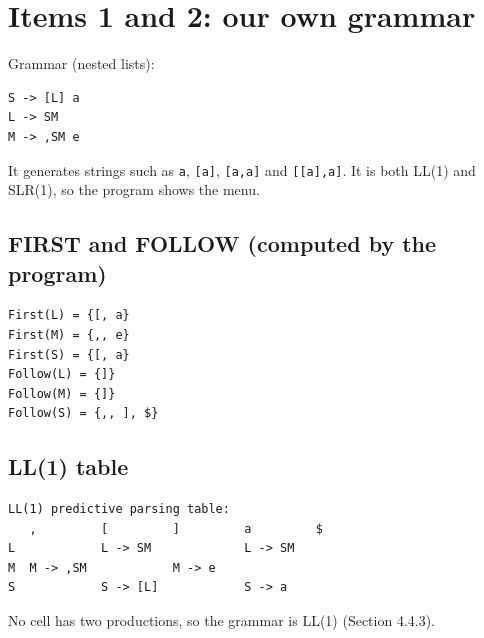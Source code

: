 \documentclass[11pt]{article}
\begin{document}
\section{Items 1 and 2: our own grammar}
Grammar (nested lists):
\begin{verbatim}
S -> [L] a
L -> SM
M -> ,SM e
\end{verbatim}
It generates strings such as \texttt{a}, \texttt{[a]}, \texttt{[a,a]} and \texttt{[[a],a]}.
It is both LL(1) and SLR(1), so the program shows the menu.

\subsection{FIRST and FOLLOW (computed by the program)}
\begin{verbatim}
First(L) = {[, a}
First(M) = {,, e}
First(S) = {[, a}
Follow(L) = {]}
Follow(M) = {]}
Follow(S) = {,, ], $}
\end{verbatim}

\subsection{LL(1) table}
\begin{verbatim}
LL(1) predictive parsing table:
   ,         [         ]         a         $         
L            L -> SM             L -> SM             
M  M -> ,SM            M -> e                        
S            S -> [L]            S -> a              
\end{verbatim}

No cell has two productions, so the grammar is LL(1) (Section 4.4.3).
\end{document}
